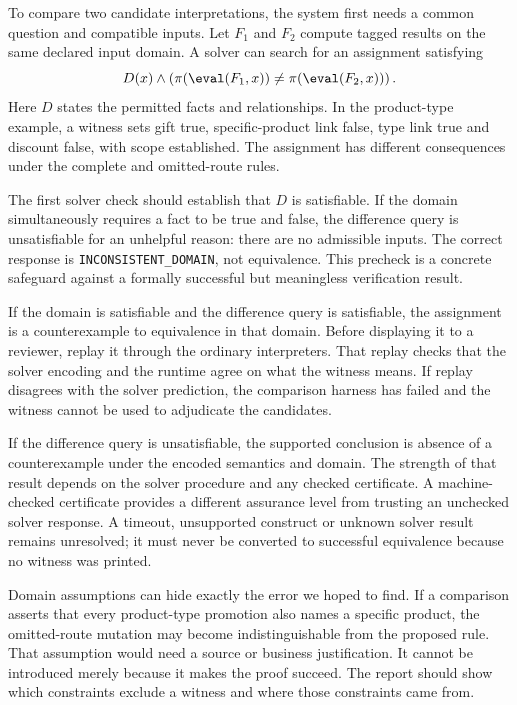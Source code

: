 \label{sec:proof-counterexamples}
To compare two candidate interpretations, the system first needs a common
question and compatible inputs. Let $F_1$ and $F_2$ compute tagged results on
the same declared input domain. A solver can search for an assignment satisfying
\begin{equation}
 D(x)\land\left(\pi(\eval(F_1,x))\ne
                         \pi(\eval(F_2,x))\right).
 \label{eq:difference-query}
\end{equation}
Here $D$ states the permitted facts and relationships. In the product-type
example, a witness sets gift true, specific-product link false, type link true
and discount false, with scope established. The assignment has different
consequences under the complete and omitted-route rules.

The first solver check should establish that $D$ is satisfiable. If the domain
simultaneously requires a fact to be true and false, the difference query is
unsatisfiable for an unhelpful reason: there are no admissible inputs. The
correct response is \texttt{INCONSISTENT\_DOMAIN}, not equivalence. This
precheck is a concrete safeguard against a formally successful but meaningless
verification result.

If the domain is satisfiable and the difference query is satisfiable, the
assignment is a counterexample to equivalence in that domain. Before displaying
it to a reviewer, replay it through the ordinary interpreters. That replay
checks that the solver encoding and the runtime agree on what the witness
means. If replay disagrees with the solver prediction, the comparison harness
has failed and the witness cannot be used to adjudicate the candidates.


If the difference query is unsatisfiable, the supported conclusion is absence
of a counterexample under the encoded semantics and domain. The strength of
that result depends on the solver procedure and any checked certificate. A
machine-checked certificate provides a different assurance level from trusting
an unchecked solver response. A timeout, unsupported construct or unknown
solver result remains unresolved; it must never be converted to successful
equivalence because no witness was printed.

Domain assumptions can hide exactly the error we hoped to find. If a comparison
asserts that every product-type promotion also names a specific product, the
omitted-route mutation may become indistinguishable from the proposed rule.
That assumption would need a source or business justification. It cannot be
introduced merely because it makes the proof succeed. The report should show
which constraints exclude a witness and where those constraints came from.

